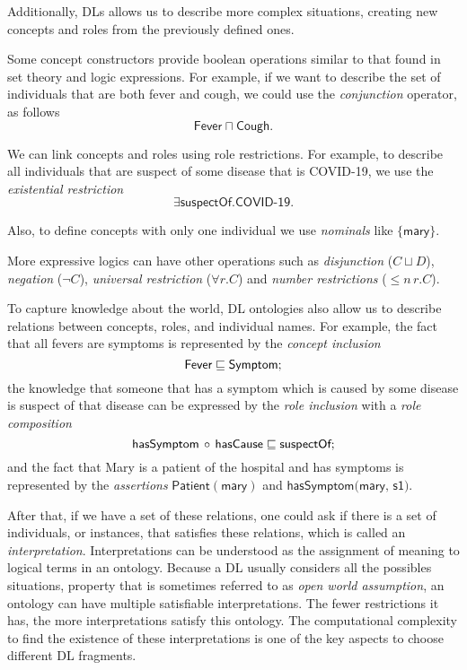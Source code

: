 Additionally, DLs allows us to describe more complex situations, creating new concepts and roles from the previously defined ones. 

Some concept constructors provide boolean operations similar to that found in set theory and logic expressions. For example, if we want to describe the set of individuals that are both fever and cough, we could use the \emph{conjunction} operator, as follows
\[
	\textsf{Fever} \sqcap \textsf{Cough}.
\]

We can link concepts and roles using role restrictions. For example, to describe all individuals that are suspect of some disease that is COVID-19, we use the \emph{existential restriction}
\[
	\exists \textsf{suspectOf}.\textsf{COVID-19}.
\]

Also, to define concepts with only one individual we use \emph{nominals} like $\{\textsf{mary}\}$.

More expressive logics can have other operations such as \emph{disjunction} ($C \sqcup D$), \emph{negation} ($\lnot C$), \emph{universal restriction} ($\forall r.C$) and \emph{number restrictions} ($\leq\!\! n\, r.C$).  

To capture knowledge about the world, DL ontologies also allow us to describe relations between concepts, roles, and individual names. For example, the fact that all fevers are symptoms is represented by the \emph{concept inclusion}
\[
	\textsf{Fever} \sqsubseteq \textsf{Symptom};	
\]
the knowledge that someone that has a symptom which is caused by some disease is suspect of that disease can be expressed by the \emph{role inclusion} with a \emph{role composition}
\[
	\textsf{hasSymptom} \, \circ \, \textsf{hasCause} \sqsubseteq \textsf{suspectOf};	
\]
and the fact that Mary is a patient of the hospital and has symptoms is represented by the \emph{assertions} $\textsf{Patient}(\textsf{mary})$ and $\textsf{hasSymptom(mary, s1)}$.

After that, if we have a set of these relations, one could ask if there is a set of individuals, or instances, that satisfies these relations, which is called an \emph{interpretation}. Interpretations can be understood as the assignment of meaning to logical terms in an ontology. Because a DL usually considers all the possibles situations, property that is sometimes referred to as \emph{open world assumption}, an ontology can have multiple satisfiable interpretations. The fewer restrictions it has, the more interpretations satisfy this ontology. The computational complexity to find the existence of these interpretations is one of the key aspects to choose different DL fragments.


